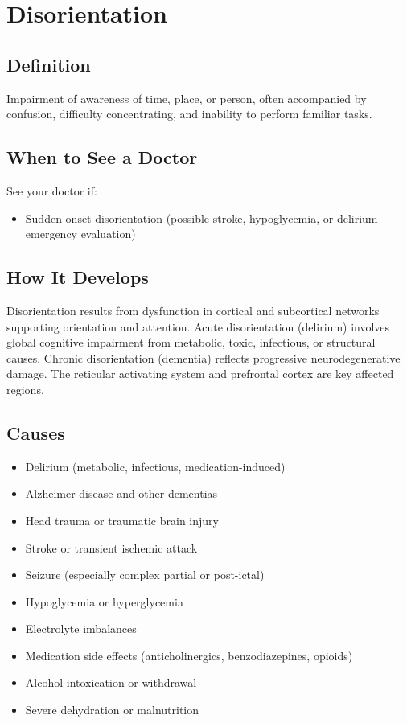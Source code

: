 \chapter{Disorientation}

\section*{Definition}
Impairment of awareness of time, place, or person, often accompanied by confusion, difficulty concentrating, and inability to perform familiar tasks.

\section*{When to See a Doctor}
See your doctor if:
\begin{itemize}
  \item Sudden-onset disorientation (possible stroke, hypoglycemia, or delirium — emergency evaluation)
\end{itemize}

\section*{How It Develops}
Disorientation results from dysfunction in cortical and subcortical networks supporting orientation and attention. Acute disorientation (delirium) involves global cognitive impairment from metabolic, toxic, infectious, or structural causes. Chronic disorientation (dementia) reflects progressive neurodegenerative damage. The reticular activating system and prefrontal cortex are key affected regions.

\section*{Causes}
\begin{itemize}
  \item Delirium (metabolic, infectious, medication-induced)
  \item Alzheimer disease and other dementias
  \item Head trauma or traumatic brain injury
  \item Stroke or transient ischemic attack
  \item Seizure (especially complex partial or post-ictal)
  \item Hypoglycemia or hyperglycemia
  \item Electrolyte imbalances
  \item Medication side effects (anticholinergics, benzodiazepines, opioids)
  \item Alcohol intoxication or withdrawal
  \item Severe dehydration or malnutrition
\end{itemize}

